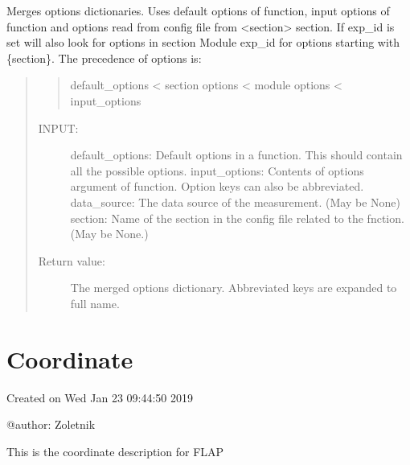 \documentclass[letterpaper,10pt,english]{sphinxmanual}
\begin{document}
\begin{fulllineitems}
\label{\detokenize{config:flap.config.merge_options}}
Merges options dictionaries. Uses default options of function, input options of function and
options read from config file from \textless{}section\textgreater{} section. If exp\_id is set will also look for options
in section Module exp\_id for options starting with \{section\}.
The precedence of options is:
\begin{quote}
\begin{quote}

default\_options \textless{} section options \textless{} module options \textless{} input\_options
\end{quote}
\begin{description}
\item[{INPUT:}] \leavevmode
default\_options: Default options in a function. This should contain all the possible options.
input\_options: Contents of options argument of function. Option keys can also be abbreviated.
data\_source: The data source of the measurement. (May be None)
section: Name of the section in the config file related to the fnction. (May be None.)

\item[{Return value:}] \leavevmode
The merged options dictionary. Abbreviated keys are expanded to full name.

\end{description}
\end{quote}

\end{fulllineitems}



\section{Coordinate}
\label{\detokenize{coordinate:module-flap.coordinate}}\label{\detokenize{coordinate:coordinate}}\label{\detokenize{coordinate::doc}}
Created on Wed Jan 23 09:44:50 2019

@author: Zoletnik

This is the coordinate description for FLAP
\end{document}
